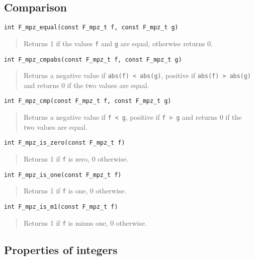 \documentclass[a4paper,10pt]{article}
\newcommand{\code}{\lstinline}
\begin{document}
\subsection{Comparison}

\begin{lstlisting}
int F_mpz_equal(const F_mpz_t f, const F_mpz_t g)
\end{lstlisting}
\begin{quote}
Returns 1 if the values \code{f} and \code{g} are equal, otherwise returns 0.
\end{quote}

\begin{lstlisting}
int F_mpz_cmpabs(const F_mpz_t f, const F_mpz_t g)
\end{lstlisting}
\begin{quote}
Returns a negative value if \code{abs(f) < abs(g)}, positive if \code{abs(f) > abs(g)} and returns 0 if the two values are equal.
\end{quote}

\begin{lstlisting}
int F_mpz_cmp(const F_mpz_t f, const F_mpz_t g)
\end{lstlisting}
\begin{quote}
Returns a negative value if \code{f < g}, positive if \code{f > g} and returns 0 if the two values are equal.
\end{quote}

\begin{lstlisting}
int F_mpz_is_zero(const F_mpz_t f)
\end{lstlisting}
\begin{quote}
Returns 1 if \code{f} is zero, 0 otherwise.
\end{quote}

\begin{lstlisting}
int F_mpz_is_one(const F_mpz_t f)
\end{lstlisting}
\begin{quote}
Returns 1 if \code{f} is one, 0 otherwise.
\end{quote}

\begin{lstlisting}
int F_mpz_is_m1(const F_mpz_t f)
\end{lstlisting}
\begin{quote}
Returns 1 if \code{f} is minus one, 0 otherwise.
\end{quote}

\subsection{Properties of integers}
\end{document}
